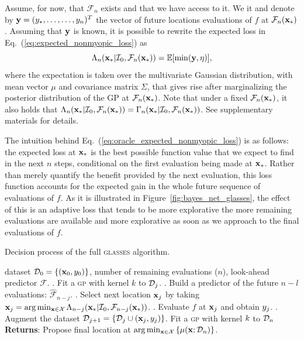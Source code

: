 \documentclass[twoside]{article}
\newcommand{\I}{\mathcal{I}}
\newcommand{\E}{\mathbb{E}}
\newcommand{\future}{\mathcal{F}}
\newcommand{\acr}[1]{\textsc{#1}\xspace}
\newcommand{\gp}{\acr{gp}}
\newcommand{\us}{\acr{glasses}}
\begin{document}
Assume, for now, that $\future_{n}$ exists and that we have access to it. We it and denote by $\mathbf{y}=(y_*,\dots,\dots,y_n)^T$ the vector of future locations evaluations of $f$ at $\future_n(\latentVector_*)$. Assuming that $\mathbf{y}$ is known, it is possible to rewrite the expected loss in Eq.~(\ref{eq:expected_nonmyopic_loss}) as
\begin{equation}\label{eq:oracle_expected_nonmyopic_loss}
\Lambda_n(\latentVector_*|\I_0, \future_{n}(\latentVector_*) ) = \E [\min (\dataVector,\eta)], 
\end{equation}
where the expectation is taken over the multivariate Gaussian distribution, with mean vector $\mu$ and covariance matrix $\Sigma$, that gives rise after marginalizing the posterior distribution of the GP at $\future_{n}(\latentVector_*)$. Note that under a fixed $\future_{n}(\latentVector_*)$, it also holds that $\Lambda_n(\latentVector_*|\I_0, \future_{n}(\latentVector_*)) = \Gamma_n(\latentVector_*|\I_0,\future_{n}(\latentVector_*))$. See supplementary materials for details.

The intuition behind Eq.~(\ref{eq:oracle_expected_nonmyopic_loss}) is as follows: the expected loss at $\mathbf{x}_*$ is the best possible function value that we expect to find in the next $n$ steps, conditional on the first evaluation being made at $\mathbf{x}_*$. Rather than merely quantify the benefit provided by the next evaluation, this loss function accounts for the expected gain in the whole future sequence of evaluations of $f$. As it is illustrated in Figure~\ref{fig:bayes_net_glasses}, the effect of this is an adaptive loss that tends to be more explorative the more remaining evaluations are available and more explorative as soon as we approach to the final evaluations of $f$.

\begin{algorithm*}[t!]
   \caption{Decision process of the full \us algorithm.}
   \label{alg:glasses}
\begin{algorithmic}
    dataset $\mathcal{D}_{0} = \{(\textbf{x}_0, y_0)\}$, number of remaining evaluations ($n$), look-ahead predictor $\future$.
   . Fit a \gp with kernel $k$ to $\mathcal{D}_{j}$.
   . Build a predictor of the future $n-l$ evaluations: $\hat{\future}_{n-j}$.
   . Select next location $\mathbf{x}_j$ by taking  $\latentVector_j = \arg \min_{\latentVector \in {\mathcal X}}\Lambda_{n-j}(\latentVector_*|\I_0, \future_{n-j}(\latentVector_*))$.
   . Evaluate $f$ at $\mathbf{x}_j$ and obtain $y_j$.
   . Augment the dataset $\mathcal{D}_{j+1} = \{\mathcal{D}_{j} \cup (\textbf{x}_j, y_j)\}$.
   \ENDFOR
   \STATE Fit a \gp with kernel $k$ to $\mathcal{D}_{n}$
   \STATE \textbf{Returns}: Propose final location at $\arg \min_{\mathbf{x} \in \mathcal{X}} \left\{\mu(\mathbf{x}; \mathcal{D}_{n})\right\}$.  
\end{algorithmic}
\end{algorithm*}
\end{document}
